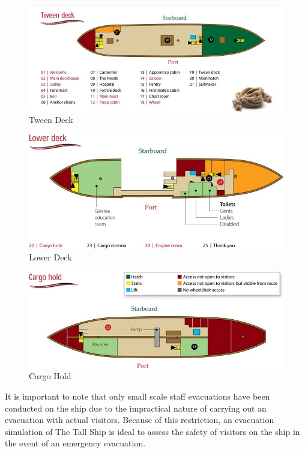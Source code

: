 \begin{figure}
\centering
\includegraphics[scale=0.4]{../images/tweendeck.jpg}
\caption{Tween Deck}
\end{figure}

\begin{figure}
\centering
\includegraphics[scale=0.4]{../images/lowerdeck.jpg}
\caption{Lower Deck}
\end{figure}

\begin{figure}
\centering
\includegraphics[scale=0.4]{../images/cargohold.jpg}
\caption{Cargo Hold}
\end{figure}

It is important to note that only small scale staff evacuations have been conducted on the ship
due to the impractical nature of carrying out an evacuation with
actual visitors. Because of this restriction, an evacuation simulation of The
Tall Ship is ideal to assess the safety of visitors on the ship in the event of an
emergency evacuation.

%

%
